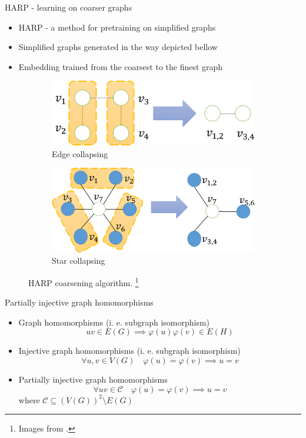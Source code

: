 \documentclass[10pt]{beamer}
\begin{document}
\begin{frame}{HARP - learning on coarser graphs}
	\begin{itemize}
		\item HARP - a method for pretraining on simplified graphs
		\item Simplified graphs generated in the way depicted bellow
		\item Embedding trained from the coarsest to the finest graph
	\end{itemize}
	\begin{figure}
		\centering
		\begin{subfigure}[t]{0.38\textwidth}
			\centering
			\includegraphics[width=\textwidth]{images/edge_collapsing.png}
			\caption{Edge collapsing}
		\end{subfigure}
		\hspace{2em}
		\begin{subfigure}[t]{0.38\textwidth}
			\centering
			\includegraphics[width=\textwidth]{images/star_collapsing.png}
			\caption{Star collapsing}
		\end{subfigure}
		\caption{HARP coarsening algorithm. \footnote{Images from \cite{chen_harp_2018}.}}
	\end{figure}
\end{frame}

\begin{frame}{Partially injective graph homomorphisms}
	\begin{itemize}
		\item Graph homomorphisms (i. e. subgraph isomorphism)
\[ uv \in E \left( G \right) \implies \varphi \left( u \right) \varphi \left( v \right) \in E \left( H \right) \]
		\item Injective graph homomorphisms (i. e. subgraph isomorphism)
\[ \forall u, v \in V \left( G \right) \quad \varphi \left( u \right) = \varphi \left( v \right) \implies u = v \]
		\item Partially injective graph homomorphisms
\[ \forall uv \in \mathcal{C} \quad \varphi \left( u \right) = \varphi \left( v \right) \implies u = v \]
			where \( \mathcal{C} \subseteq \left( V \left( G \right) \right)^2 \setminus E \left( G \right) \)
	\end{itemize}
\end{frame}
\end{document}
